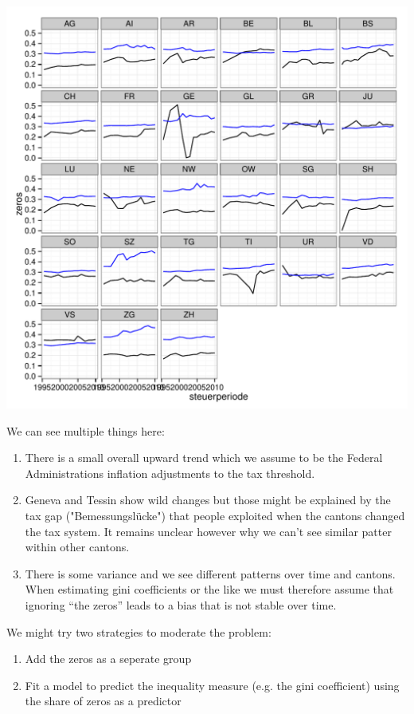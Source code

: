\documentclass[twoside]{article}\usepackage[]{graphicx}\usepackage[]{color}
\makeatletter
\def\maxwidth{ %
  \ifdim\Gin@nat@width>\linewidth
    \linewidth
  \else
    \Gin@nat@width
  \fi
}
\newenvironment{knitrout}{}{} %
\makeatother
\begin{document}
\begin{multicols}{2}
\begin{knitrout}
\includegraphics[width=\maxwidth]{figure/zero_descriptives2} 

\end{knitrout}


We can see multiple things here:

\begin{enumerate}
\item There is a small overall upward trend which we assume to be the Federal Administrations inflation adjustments to the tax threshold.
\item Geneva and Tessin show wild changes but those might be explained by the tax gap ("Bemessungslücke") that people exploited when the cantons changed the tax system. It remains unclear however why we can't see similar patter within other cantons.
\item There is some variance and we see different patterns over time and cantons. When estimating gini coefficients or the like we must therefore assume that ignoring ``the zeros'' leads to a bias that is not stable over time.
\end{enumerate}

We might try two strategies to moderate the problem:

\begin{enumerate}
\item Add the zeros as a seperate group
\item Fit a model to predict the inequality measure (e.g. the gini coefficient) using the share of zeros as a predictor
\end{enumerate}


\end{multicols}
\end{document}
